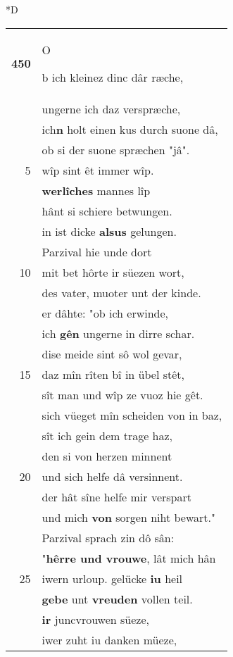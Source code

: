 \documentclass[8pt,a4paper,notitlepage]{article}
\begin{document}
\begin{table}[ht]
\begin{minipage}[t]{0.5\linewidth}
\small
\begin{center}*D
\end{center}
\begin{tabular}{rl}
\textbf{450} & \begin{large}O\end{large}b ich kleinez dinc dâr ræche,\\ 
 & ungerne ich daz verspræche,\\ 
 & ich\textbf{n} holt einen kus durch suone dâ,\\ 
 & ob si der suone spræchen "jâ".\\ 
5 & wîp sint êt immer wîp.\\ 
 & \textbf{werlîches} mannes lîp\\ 
 & hânt si schiere betwungen.\\ 
 & in ist dicke \textbf{alsus} gelungen.\\ 
 & Parzival hie unde dort\\ 
10 & mit bet hôrte ir süezen wort,\\ 
 & des vater, muoter unt der kinde.\\ 
 & er dâhte: "ob ich erwinde,\\ 
 & ich \textbf{gên} ungerne in dirre schar.\\ 
 & dise meide sint sô wol gevar,\\ 
15 & daz mîn rîten bî in übel stêt,\\ 
 & sît man und wîp ze vuoz hie gêt.\\ 
 & sich vüeget mîn scheiden von in baz,\\ 
 & sît ich gein dem trage haz,\\ 
 & den si von herzen minnent\\ 
20 & und sich helfe dâ versinnent.\\ 
 & der hât sîne helfe mir verspart\\ 
 & und mich \textbf{von} sorgen niht bewart."\\ 
 & Parzival sprach zin dô sân:\\ 
 & "\textbf{hêrre und vrouwe}, lât mich hân\\ 
25 & iwern urloup. gelücke \textbf{iu} heil\\ 
 & \textbf{gebe} unt \textbf{vreuden} vollen teil.\\ 
 & \textbf{ir} juncvrouwen süeze,\\ 
 & iwer zuht iu danken müeze,\\ 

\end{tabular}
\end{minipage}
\end{table}
\end{document}
